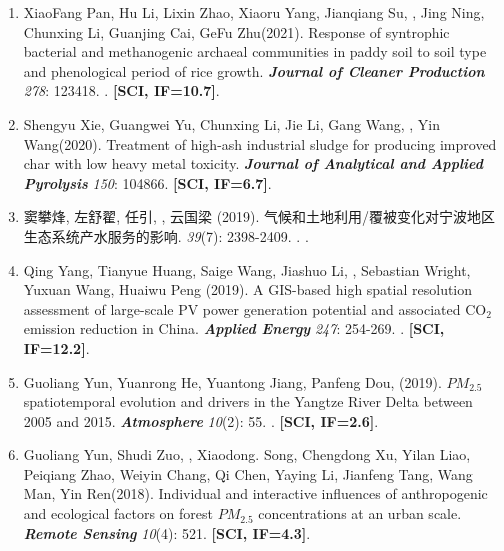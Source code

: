 \begin{enumerate}
    Access to bike lanes and childhood obesity: a systematic review and meta‐analysis.
    \textbf{\textit{Obesity Reviews}} 22: e13042.
    . 
    \textbf{[SCI, IF=7.6]}.
\item
    XiaoFang Pan, Hu Li, Lixin Zhao, Xiaoru Yang, Jianqiang Su, \Shaoqing, Jing Ning, Chunxing Li, Guanjing Cai, GeFu Zhu\CS (2021).
    Response of syntrophic bacterial and methanogenic archaeal communities in paddy soil to soil type and phenological period of rice growth.
    \textbf{\textit{Journal of Cleaner Production}} \textit{278}: 123418.
    .
    \textbf{[SCI, IF=10.7]}.
\item
    Shengyu Xie, Guangwei Yu\CS, Chunxing Li, Jie Li, Gang Wang, \Shaoqing, Yin Wang\CS (2020).
    Treatment of high-ash industrial sludge for producing improved char with low heavy metal toxicity.
    \textbf{\textit{Journal of Analytical and Applied Pyrolysis}} \textit{150}: 104866.
    \textbf{[SCI, IF=6.7]}.
\item
    窦攀烽, 左舒翟, 任引, {}, 云国梁 (2019).
    气候和土地利用/覆被变化对宁波地区生态系统产水服务的影响.
    \textbf{} \textit{39}(7): 2398-2409.
    .
    \textbf{}.
\item
    Qing Yang\CS, Tianyue Huang, Saige Wang\CS, Jiashuo Li\CS, \Shaoqing, Sebastian Wright, Yuxuan Wang, Huaiwu Peng (2019).
    A GIS-based high spatial resolution assessment of large-scale PV power generation potential and associated CO$_2$ emission reduction in China.
    \textbf{\textit{Applied Energy}} \textit{247}: 254-269.
    .
    \textbf{[SCI, IF=12.2]}.
\item
    Guoliang Yun, Yuanrong He\CS, Yuantong Jiang, Panfeng Dou, \Shaoqing \enspace (2019).
    $PM_{2.5}$ spatiotemporal evolution and drivers in the Yangtze River Delta between 2005 and 2015.
    \textbf{\textit{Atmosphere}} \textit{10}(2): 55.
    . 
    \textbf{[SCI, IF=2.6]}.
\item
    Guoliang Yun, Shudi Zuo, \Shaoqing, Xiaodong. Song, Chengdong Xu, Yilan Liao, Peiqiang Zhao, Weiyin Chang, Qi Chen, Yaying Li, Jianfeng Tang, Wang Man, Yin Ren\CS (2018).
    Individual and interactive influences of anthropogenic and ecological factors on forest $PM_{2.5}$ concentrations at an urban scale.
    \textbf{\textit{Remote Sensing}} \textit{10}(4): 521.
    \textbf{[SCI, IF=4.3]}.

\end{enumerate}
